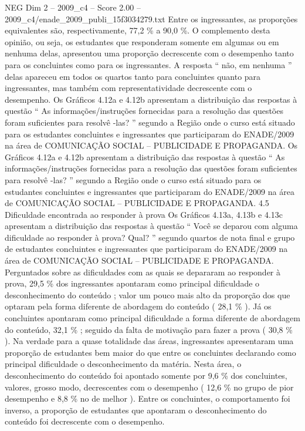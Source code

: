 \begin{textsample}{NEG Dim 2 – 2009\_c4 – Score 2.00 – 2009\_c4/enade\_2009\_publi\_15f3034279.txt}
Entre os ingressantes, as proporções equivalentes são, respectivamente, 77,2 \% a 90,0 \%.
O complemento desta opinião, ou seja, os estudantes que responderam somente em algumas ou em nenhuma delas, apresentou uma proporção decrescente com o desempenho tanto para os concluintes como para os ingressantes.
A resposta “ não, em nenhuma ” delas apareceu em todos os quartos tanto para concluintes quanto para ingressantes, mas também com representatividade decrescente com o desempenho.
Os Gráficos 4.12a e 4.12b apresentam a distribuição das respostas à questão “ As informações/instruções fornecidas para a resolução das questões foram suficientes para resolvê -las? ” segundo a Região onde o curso está situado para os estudantes concluintes e ingressantes que participaram do ENADE/2009 na área de COMUNICAÇÃO SOCIAL – PUBLICIDADE E PROPAGANDA.
Os Gráficos 4.12a e 4.12b apresentam a distribuição das respostas à questão “ As informações/instruções fornecidas para a resolução das questões foram suficientes para resolvê -las? ” segundo a Região onde o curso está situado para os estudantes concluintes e ingressantes que participaram do ENADE/2009 na área de COMUNICAÇÃO SOCIAL – PUBLICIDADE E PROPAGANDA. 4.5 Dificuldade encontrada ao responder à prova Os Gráficos 4.13a, 4.13b e 4.13c apresentam a distribuição das respostas à questão “ Você se deparou com alguma dificuldade ao responder à prova?
Qual? ” segundo quartos de nota final e grupo de estudantes concluintes e ingressantes que participaram do ENADE/2009 na área de COMUNICAÇÃO SOCIAL – PUBLICIDADE E PROPAGANDA.
Perguntados sobre as dificuldades com as quais se depararam ao responder à prova, 29,5 \% dos ingressantes apontaram como principal dificuldade o desconhecimento do conteúdo ; valor um pouco mais alto da proporção dos que optaram pela forma diferente de abordagem do conteúdo ( 28,1 \% ).
Já os concluintes apontaram como principal dificuldade a forma diferente de abordagem do conteúdo, 32,1 \% ; seguido da falta de motivação para fazer a prova ( 30,8 \% ).
Na verdade para a quase totalidade das áreas, ingressantes apresentaram uma proporção de estudantes bem maior do que entre os concluintes declarando como principal dificuldade o desconhecimento da matéria.
Nesta área, o desconhecimento do conteúdo foi apontado somente por 9,6 \% dos concluintes, valores, grosso modo, decrescentes com o desempenho ( 12,6 \% no grupo de pior desempenho e 8,8 \% no de melhor ).
Entre os concluintes, o comportamento foi inverso, a proporção de estudantes que apontaram o desconhecimento do conteúdo foi decrescente com o desempenho.

\end{textsample}
